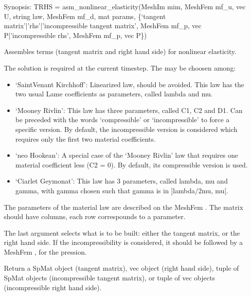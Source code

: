 \documentclass[a4paper,11pt,english]{sphinxmanual}
\begin{document}

\begin{fulllineitems}
\label{\detokenize{python/cmdref_Module asm:getfem.asm_nonlinear_elasticity}}
Synopsis: TRHS = asm\_nonlinear\_elasticity(MeshIm mim, MeshFem mf\_u, vec U, string law, MeshFem mf\_d, mat params, \{‘tangent matrix’|’rhs’|’incompressible tangent matrix’, MeshFem mf\_p, vec P|’incompressible rhs’, MeshFem mf\_p, vec P\})

Assembles terms (tangent matrix and right hand side) for nonlinear elasticity.

The solution  is required at the current time\sphinxhyphen{}step. The 
may be choosen among:
\begin{itemize}
\item {} 
‘SaintVenant Kirchhoff’:
Linearized law, should be avoided. This law has the two usual
Lame coefficients as parameters, called lambda and mu.

\item {} 
‘Mooney Rivlin’:
This law has three parameters, called C1, C2 and D1.
Can be preceded with the words ‘compressible’ or ‘incompressible’ to force
a specific version. By default, the incompressible version is considered
which requires only the first two material coefficients.

\item {} 
‘neo Hookean’:
A special case of the ‘Mooney Rivlin’ law that requires one material
coefficient less (C2 = 0). By default, its compressible version is used.

\item {} 
‘Ciarlet Geymonat’:
This law has 3 parameters, called lambda, mu and gamma, with
gamma chosen such that gamma is in {]}\sphinxhyphen{}lambda/2\sphinxhyphen{}mu, \sphinxhyphen{}mu{[}.

\end{itemize}

The parameters of the material law are described on the MeshFem .
The matrix  should have  columns, each row
correspounds to a parameter.

The last argument selects what is to be built: either the tangent
matrix, or the right hand side. If the incompressibility is
considered, it should be followed by a MeshFem , for the
pression.

Return a SpMat object (tangent matrix), vec object (right hand
side), tuple of SpMat objects (incompressible tangent matrix), or
tuple of vec objects (incompressible right hand side).

\end{fulllineitems}
\end{document}
